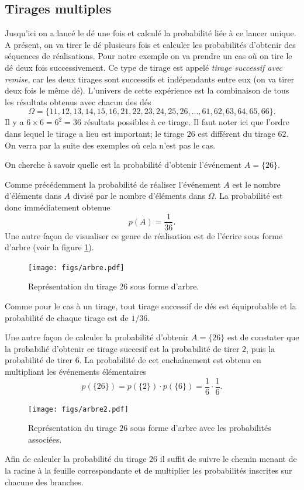 \documentclass[a4paper,12pt]{book}
\begin{document}
\subsection{Tirages multiples}

Jusqu'ici on a lancé le dé une fois et calculé la probabilité liée à ce lancer unique. 
A présent, on va tirer le dé plusieurs fois et calculer les probabilités d'obtenir des séquences 
de réalisations. Pour notre exemple on va prendre un cas où on tire le dé deux fois successivement.
Ce type de tirage est appelé \textit{tirage successif avec remise}, car les deux tirages sont 
successifs et indépendants entre eux (on va tirer deux fois le même dé). L'univers de 
cette expérience est la combinaison de tous les résultats obtenus avec chacun des dés
\begin{equation}
 \Omega=\{11,12,13,14,15,16,21,22,23,24,25,26,...,61,62,63,64,65,66\}.
\end{equation}
Il y a $6\times 6=6^2=36$ résultats possibles à ce tirage. Il faut noter ici que l'ordre dans lequel le tirage 
a lieu est important; le tirage $26$ est différent du tirage $62$. On verra par la suite des exemples où cela n'est pas le cas.

On cherche à savoir quelle est la probabilité d'obtenir l'événement $A=\{26\}$.

Comme précédemment la probabilité de réaliser l'événement $A$ est le nombre d'éléments dans $A$ divisé par le nombre d'éléments dans $\Omega$.
La probabilité est donc immédiatement obtenue
\begin{equation}
 p(A)=\frac{1}{36}.
\end{equation}
Une autre façon de visualiser ce genre de réalisation est de l'écrire sous forme d'arbre
(voir la figure \ref{fig_arbre}).
\begin{figure}[htp]
\texttt{[image: figs/arbre.pdf]}
\caption{Représentation du tirage $26$ sous forme d'arbre.}\label{fig_arbre}
\end{figure}
Comme pour le cas à un tirage, tout tirage successif de dés est équiprobable et la probabilité
de chaque tirage est de $1/36$.

Une autre façon de calculer la probabilité d'obtenir $A=\{26\}$ est de constater que la probabilié 
d'obtenir ce tirage succesif est la probabilité de tirer $2$, puis la probabilité de tirer $6$. La probabilité
de cet enchaînement est obtenu en multipliant les événements élémentaires
\begin{equation}
 p(\{26\})=p(\{2\})\cdot p(\{6\})=\frac{1}{6}\cdot\frac{1}{6}.
\end{equation}
\begin{figure}[htp]
\texttt{[image: figs/arbre2.pdf]}
\caption{Représentation du tirage $26$ sous forme d'arbre avec les probabilités associées.}\label{fig_arbre2}
\end{figure}
Afin de calculer la probabilité du tirage $26$ il suffit de suivre le chemin menant de la racine à la feuille correspondante
et de multiplier les probabilités inscrites sur chacune des branches.
\end{document}
